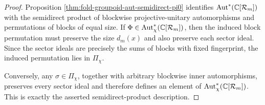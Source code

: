 \begin{proof}
Proposition \ref{thm:fold-groupoid-aut-semidirect-pi0} identifies \(\operatorname{Aut}^\ast(\mathbb{C}[\mathcal R_m])\) with the semidirect product of blockwise projective-unitary automorphisms and permutations of blocks of equal size. If \(\Phi\in\operatorname{Aut}^\ast_{\chi}(\mathbb{C}[\mathcal R_m])\), then the induced block permutation must preserve the size \(d_m(x)\) and also preserve each sector ideal. Since the sector ideals are precisely the sums of blocks with fixed fingerprint, the induced permutation lies in \(\Pi_\chi\).

Conversely, any \(\sigma\in\Pi_\chi\), together with arbitrary blockwise inner automorphisms, preserves every sector ideal and therefore defines an element of \(\operatorname{Aut}^\ast_{\chi}(\mathbb{C}[\mathcal R_m])\). This is exactly the asserted semidirect-product description.
\end{proof}

\endinput
